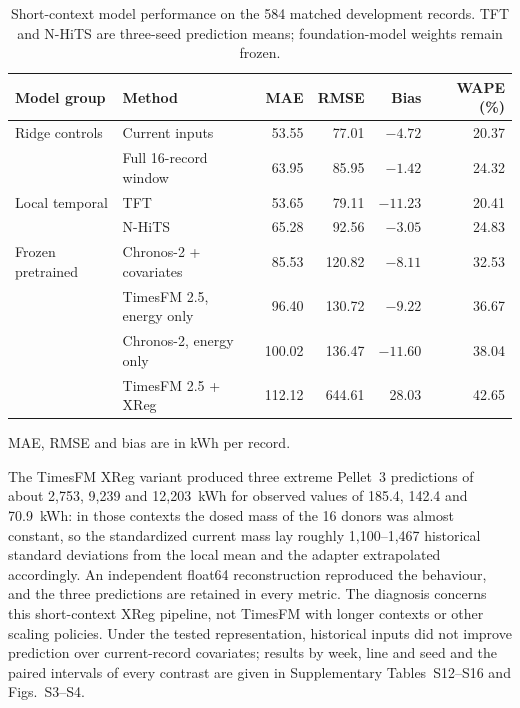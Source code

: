 \begin{table}[!htbp]\centering\small\setlength{\tabcolsep}{4.5pt}
\caption{Short-context model performance on the 584 matched development records. TFT and N-HiTS are three-seed prediction means; foundation-model weights remain frozen.}\label{tab:gpu}
\begin{tabular}{@{}llrrrr@{}}\toprule
Model group & Method & MAE & RMSE & Bias & WAPE (\%) \\\midrule
Ridge controls & Current inputs & 53.55 & 77.01 & $-4.72$ & 20.37 \\
 & Full 16-record window & 63.95 & 85.95 & $-1.42$ & 24.32 \\\addlinespace
Local temporal & TFT & 53.65 & 79.11 & $-11.23$ & 20.41 \\
 & N-HiTS & 65.28 & 92.56 & $-3.05$ & 24.83 \\\addlinespace
Frozen pretrained & Chronos-2 + covariates & 85.53 & 120.82 & $-8.11$ & 32.53 \\
 & TimesFM 2.5, energy only & 96.40 & 130.72 & $-9.22$ & 36.67 \\
 & Chronos-2, energy only & 100.02 & 136.47 & $-11.60$ & 38.04 \\
 & TimesFM 2.5 + XReg & 112.12 & 644.61 & 28.03 & 42.65 \\\bottomrule
\end{tabular}\par\vspace{4pt}\footnotesize MAE, RMSE and bias are in kWh per record.
\end{table}


The TimesFM XReg variant produced three extreme Pellet~3 predictions of about 2,753, 9,239 and 12,203~kWh for observed values of 185.4, 142.4 and 70.9~kWh: in those contexts the dosed mass of the 16 donors was almost constant, so the standardized current mass lay roughly 1,100--1,467 historical standard deviations from the local mean and the adapter extrapolated accordingly. An independent float64 reconstruction reproduced the behaviour, and the three predictions are retained in every metric. The diagnosis concerns this short-context XReg pipeline, not TimesFM with longer contexts or other scaling policies. Under the tested representation, historical inputs did not improve prediction over current-record covariates; results by week, line and seed and the paired intervals of every contrast are given in Supplementary Tables~S12--S16 and Figs.~S3--S4.

